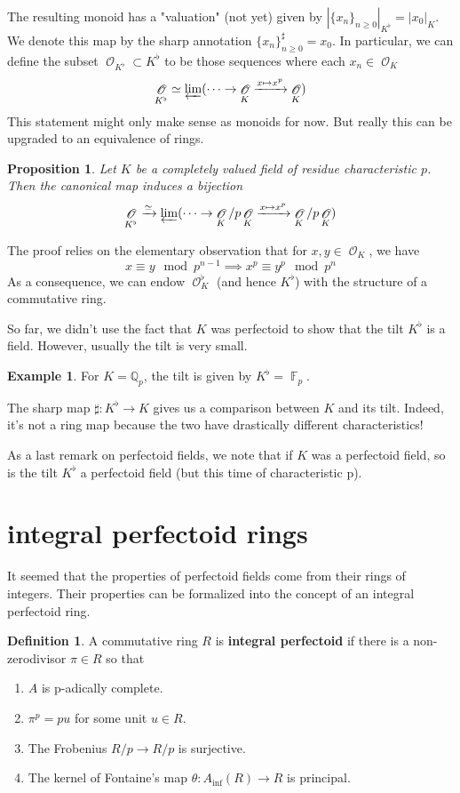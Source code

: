 \documentclass[12pt]{amsproc}
\newtheorem*{prop}{Proposition}
\theoremstyle{definition}
\newtheorem*{definition}{Definition}
\newtheorem*{example}{Example}
\newcommand{\Q}{\mathbb{Q}}
\newcommand{\htpyeq}{\simeq}
\newcommand{\ra}{\rightarrow}
\newcommand{\xra}{\xrightarrow}
\DeclareMathOperator{\invlim}{\varprojlim}
\DeclareMathOperator{\Oh}{\mathscr{O}}
\DeclareMathOperator{\F}{\mathbb{F}}
\begin{document}
The resulting monoid has a "valuation" (not yet) given by $|\{x_n\}_{n\ge 0}|_{K^\flat}=|x_0|_K$. We denote this map by the sharp annotation $\{x_n\}_{n\ge 0}^\sharp=x_0$. In particular, we can define the subset $\Oh_{K^\flat}\subset K^\flat$ to be those sequences where each $x_n\in\Oh_K$
\[	\Oh_{K^\flat}\htpyeq \invlim(\cdots\ra \Oh_K\xra{x\mapsto x^p}\Oh_K)	\]
This statement might only make sense as monoids for now. But really this can be upgraded to an equivalence of rings.

\begin{prop} Let $K$ be a completely valued field of residue characteristic $p$. Then the canonical map induces a bijection
\[	\Oh_{K^\flat}\xra{\htpyeq} \invlim(\cdots\ra \Oh_K/p\Oh_K\xra{x\mapsto x^p}\Oh_K/p\Oh_K) \]
\end{prop}

The proof relies on the elementary observation that for $x,y\in \Oh_K$, we have 
\[ x\equiv y\mod p^{n-1} \implies x^p\equiv y^p\mod p^n\]
As a consequence, we can endow $\Oh_K^\flat$ (and hence $K^\flat$) with the structure of a commutative ring.

So far, we didn't use the fact that $K$ was perfectoid to show that the tilt $K^\flat$ is a field. However, usually the tilt is very small.

\begin{example} For $K=\Q_p$, the tilt is given by $K^\flat=\F_p$.
\end{example}

The sharp map $\sharp:K^\flat \ra K$ gives us a comparison between $K$ and its tilt. Indeed, it's not a ring map because the two have drastically different characteristics! 

As a last remark on perfectoid fields, we note that if $K$ was a perfectoid field, so is the tilt $K^\flat$ a perfectoid field (but this time of characteristic p).

\section{integral perfectoid rings}

It seemed that the properties of perfectoid fields come from their rings of integers. Their properties can be formalized into the concept of an integral perfectoid ring.

\begin{definition} A commutative ring $R$ is \textbf{integral perfectoid} if there is a non-zerodivisor $\pi\in R$ so that
\begin{enumerate}
\item $A$ is p-adically complete.
\item $\pi^p=pu$ for some unit $u\in R$.
\item The Frobenius $R/p\ra R/p$ is surjective.
\item The kernel of Fontaine's map $\theta:A_\text{inf}(R)\ra R$ is principal.
\end{enumerate}
\end{definition}
\end{document}
